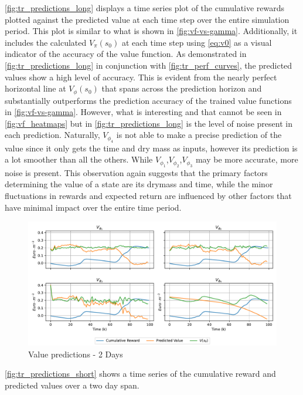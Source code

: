 \autoref{fig:tr_predictions_long} displays a time series plot of the cumulative rewards plotted against the predicted value at each time step over the entire simulation period. This plot is similar to what is shown in \autoref{fig:vf-vs-gamma}. Additionally, it includes the calculated $V_\pi (s_0)$ at each time step using \autoref{eq:v0} as a visual indicator of the accuracy of the value function. As demonstrated in \autoref{fig:tr_predictions_long} in conjunction with \autoref{fig:tr_perf_curves}, the predicted values show a high level of accuracy. This is evident from the nearly perfect horizontal line at $V_\phi (s_0)$ that spans across the prediction horizon and substantially outperforms the prediction accuracy of the trained value functions in \autoref{fig:vf-vs-gamma}.  However, what is interesting and that cannot be seen in \autoref{fig:vf_heatmaps} but in \autoref{fig:tr_predictions_long} is the level of noise present in each prediction. Naturally, $V_{\phi_4}$ is not able to make a precise prediction of the value since it only gets the time and dry mass as inputs, however its prediction is a lot smoother than all the others. While $V_{\phi_1}$,$V_{\phi_2}$,$V_{\phi_3}$ may be more accurate, more noise is present. This observation again suggests that the primary factors determining the value of a state are its drymass and time, while the minor fluctuations in rewards and expected return are influenced by other factors that have minimal impact over the entire time period.



\begin{figure}[H]
	\centering
	\includegraphics[width = \textwidth]{figures/vf_time_predictions_short.pdf}
	\caption{Value predictions - 2 Days}
	\label{fig:tr_predictions_short}
\end{figure}

	


\autoref{fig:tr_predictions_short} shows a time series of the cumulative reward and predicted values over a two day span. 

